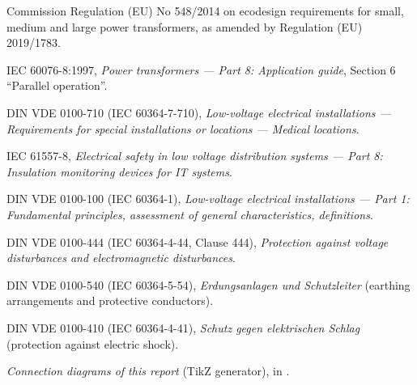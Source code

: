 \begin{enumerate}[label={[\arabic*]}, leftmargin=*, itemsep=0.4em]
  \item Commission Regulation (EU) No 548/2014 on ecodesign requirements for small, medium and large power transformers, as amended by Regulation (EU) 2019/1783.
  \item IEC 60076-8:1997, \emph{Power transformers --- Part 8: Application guide}, Section 6 ``Parallel operation''.
  \item DIN VDE 0100-710 (IEC 60364-7-710), \emph{Low-voltage electrical installations --- Requirements for special installations or locations --- Medical locations}.
  \item IEC 61557-8, \emph{Electrical safety in low voltage distribution systems --- Part 8: Insulation monitoring devices for IT systems}.
  \item DIN VDE 0100-100 (IEC 60364-1), \emph{Low-voltage electrical installations --- Part 1: Fundamental principles, assessment of general characteristics, definitions}.
  \item DIN VDE 0100-444 (IEC 60364-4-44, Clause 444), \emph{Protection against voltage disturbances and electromagnetic disturbances}.
  \item DIN VDE 0100-540 (IEC 60364-5-54), \emph{Erdungsanlagen und Schutzleiter} (earthing arrangements and protective conductors).
  \item DIN VDE 0100-410 (IEC 60364-4-41), \emph{Schutz gegen elektrischen Schlag} (protection against electric shock).
  \item \emph{Connection diagrams of this report} (TikZ generator),
         in
        .
\end{enumerate}
